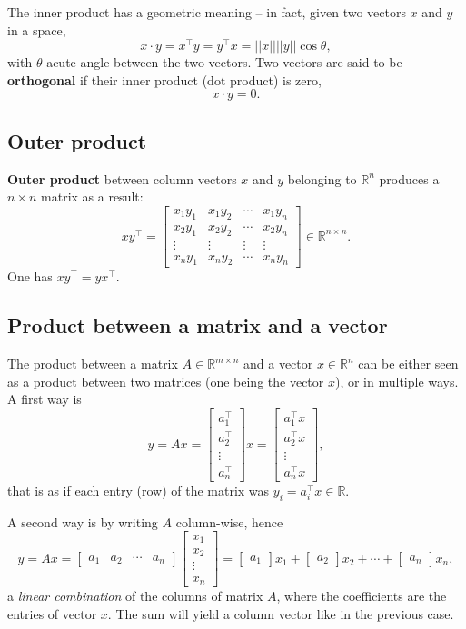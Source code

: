 \documentclass[10pt]{report}
\begin{document}
The inner product has a geometric meaning -- in fact, given two vectors \(x\) and \(y\) in a space, $$x \cdot y = x^\top y = y^\top x = ||x||||y||\cos\theta,$$ with \(\theta\) acute angle between the two vectors. Two vectors are said to be \textbf{orthogonal} if their inner product (dot product) is zero, $$x \cdot y = 0.$$
\subsection{Outer product}
\label{sec:org095464a}
\textbf{Outer product} between column vectors \(x\) and \(y\) belonging to \(\mathbb{R}^n\) produces a \(n\times n\) matrix as a result: $$x y^\top = \begin{bmatrix}x_1y_1 & x_1 y_2 & \cdots & x_1 y_n \\ x_2 y_1 & x_2 y_2 & \cdots & x_2 y_n \\ \vdots & \vdots & \vdots & \vdots \\ x_n y_1 & x_n y_2 & \cdots & x_n y_n\end{bmatrix} \in \mathbb{R}^{n \times n}.$$ One has \(xy^\top = yx^\top\).
\subsection{Product between a matrix and a vector}
\label{sec:org065cc2d}
The product between a matrix \(A\in \mathbb{R}^{m \times n}\) and a vector \(x \in \mathbb{R}^n\) can be either seen as a product between two matrices (one being the vector \(x\)), or in multiple ways. A first way is $$y = Ax = \begin{bmatrix}a_1^\top \\ a_2^\top \\ \vdots \\ a_n^\top\end{bmatrix}x = \begin{bmatrix}a_1^\top x \\ a_2^\top x \\ \vdots \\ a_n^\top x\end{bmatrix},$$ that is as if each entry (row) of the matrix was \(y_i = a_i^\top x \in \mathbb R\).

A second way is by writing \(A\) column\--wise, hence $$y = Ax = \begin{bmatrix} a_1 & a_2 & \cdots & a_n\end{bmatrix}\begin{bmatrix}x_1 \\ x_2 \\ \vdots \\ x_n\end{bmatrix} = \begin{bmatrix}a_1\end{bmatrix}x_1 + \begin{bmatrix}a_2\end{bmatrix}x_2 + \cdots + \begin{bmatrix}a_n\end{bmatrix}x_n,$$ a \emph{linear combination} of the columns of matrix \(A\), where the coefficients are the entries of vector \(x\). The sum will yield a column vector like in the previous case.
\end{document}
